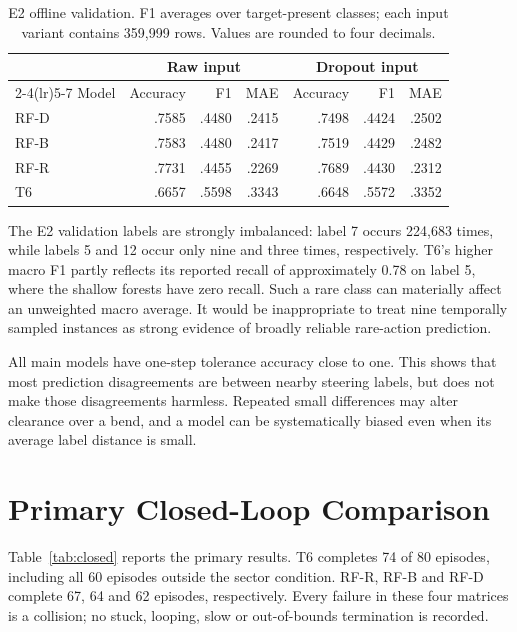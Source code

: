 \begin{table}[htbp]
\centering\small
\caption[Offline validation on E2]{E2 offline validation. F1 averages over target-present classes; each
input variant contains 359,999 rows. Values are rounded to four decimals.}
\label{tab:offline}
\begin{tabular}{lrrrrrr}
\toprule & \multicolumn{3}{c}{Raw input} & \multicolumn{3}{c}{Dropout input} \\
\cmidrule(lr){2-4}\cmidrule(lr){5-7}
Model & Accuracy & F1 & MAE & Accuracy & F1 & MAE \\\midrule
RF-D & .7585 & .4480 & .2415 & .7498 & .4424 & .2502 \\
RF-B & .7583 & .4480 & .2417 & .7519 & .4429 & .2482 \\
RF-R & .7731 & .4455 & .2269 & .7689 & .4430 & .2312 \\
T6 & .6657 & .5598 & .3343 & .6648 & .5572 & .3352 \\
\bottomrule
\end{tabular}
\end{table}

The E2 validation labels are strongly imbalanced: label 7 occurs 224,683
times, while labels 5 and 12 occur only nine and three times, respectively.
T6's higher macro F1 partly reflects its reported recall of approximately
0.78 on label 5, where the shallow forests have zero recall. Such a rare
class can materially affect an unweighted macro average. It would be
inappropriate to treat nine temporally sampled instances as strong evidence
of broadly reliable rare-action prediction.

All main models have one-step tolerance accuracy close to one. This shows
that most prediction disagreements are between nearby steering labels, but
does not make those disagreements harmless. Repeated small differences may
alter clearance over a bend, and a model can be systematically biased even
when its average label distance is small.

\section{Primary Closed-Loop Comparison}
Table~\ref{tab:closed} reports the primary results. T6 completes 74 of 80
episodes, including all 60 episodes outside the sector condition. RF-R,
RF-B and RF-D complete 67, 64 and 62 episodes, respectively. Every failure
in these four matrices is a collision; no stuck, looping, slow or
out-of-bounds termination is recorded.

